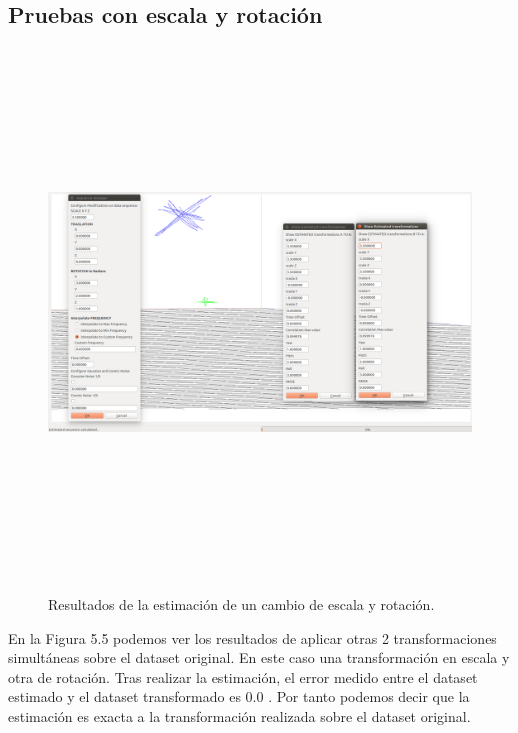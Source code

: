 \subsection{Pruebas con escala y rotación}

\begin{figure}[H]
\begin{center}
\label{fig:escalaRotationTest}\includegraphics[height=14.0cm,width=18.0cm]{img/cap6/Escala_Rotation_abba.png}
\hspace{0.5cm}

\end{center}

\caption{Resultados de la estimación de un cambio de escala y rotación.}
\end{figure}
En la Figura 5.5 podemos ver los resultados de aplicar otras 2 transformaciones simultáneas sobre el dataset original. En este caso una transformación en escala y otra de rotación. Tras realizar la estimación, el error medido entre el dataset estimado y el dataset transformado es 0.0 . Por tanto podemos decir que la estimación es exacta a la transformación realizada sobre el dataset original.

